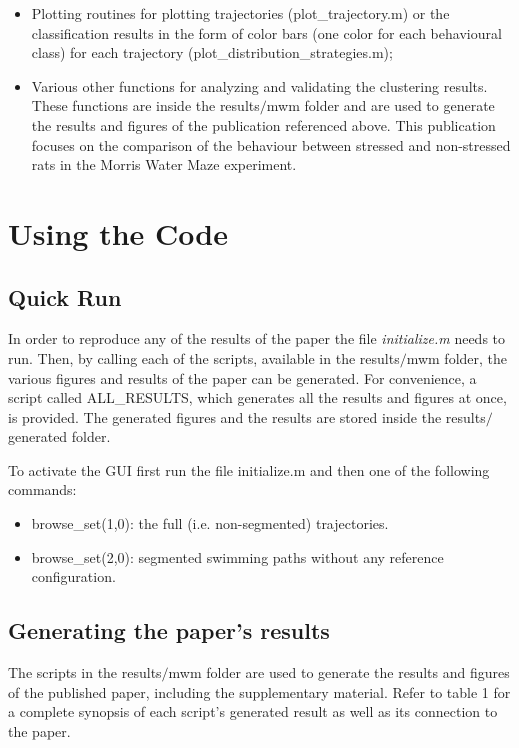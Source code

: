 \documentclass[12pt,titlepage]{article}
\begin{document}
\begin{doublespace}
\begin{itemize}
	\item Plotting routines for plotting trajectories (plot\_trajectory.m) or the classification results in the form of color bars (one color for each behavioural class) for each trajectory (plot\_distribution\_strategies.m);
	
	\item Various other functions for analyzing and validating the clustering results. These functions are inside the results$/$mwm folder and are used to generate the results and figures of the publication referenced above. This publication focuses on the comparison of the behaviour between stressed and non-stressed rats in the Morris Water Maze experiment.
\end{itemize}


\section{Using the Code}
\subsection{Quick Run}

In order to reproduce any of the results of the paper the file \textit{initialize.m} needs to run. Then, by calling each of the scripts, available in the results$/$mwm folder, the various figures and results of the paper can be generated. For convenience, a script called ALL\_RESULTS, which generates all the results and figures at once, is provided. The generated figures and the results are stored inside the results$/$generated folder.

To activate the GUI first run the file initialize.m and then one of the following commands:
\begin{itemize}
	\item browse\_set(1,0): the full (i.e. non-segmented) trajectories.
	\item browse\_set(2,0): segmented swimming paths without any reference configuration.
\end{itemize}

\subsection{Generating the paper's results}

The scripts in the results$/$mwm folder are used to generate the results and figures of the published paper, including the supplementary material. Refer to table 1 for a complete synopsis of each script's generated result as well as its connection to the paper.


\end{doublespace}
\end{document}
